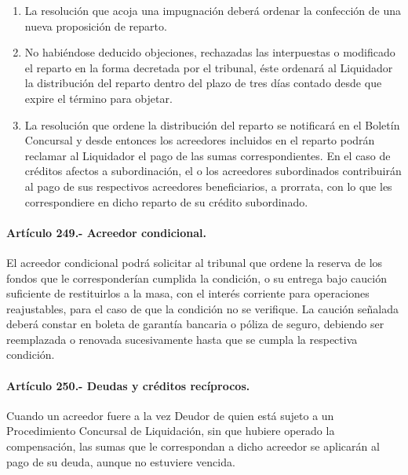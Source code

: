 \documentclass[
]{book}
\begin{document}
\begin{enumerate}
\def\labelenumi{\arabic{enumi})}
\setcounter{enumi}{6}
\item
  La resolución que acoja una impugnación deberá ordenar la confección de una nueva proposición de reparto.
\item
  No habiéndose deducido objeciones, rechazadas las interpuestas o modificado el reparto en la forma decretada por el tribunal, éste ordenará al Liquidador la distribución del reparto dentro del plazo de tres días contado desde que expire el término para objetar.
\item
  La resolución que ordene la distribución del reparto se notificará en el Boletín Concursal y desde entonces los acreedores incluidos en el reparto podrán reclamar al Liquidador el pago de las sumas correspondientes. En el caso de créditos afectos a subordinación, el o los acreedores subordinados contribuirán al pago de sus respectivos acreedores beneficiarios, a prorrata, con lo que les correspondiere en dicho reparto de su crédito subordinado.
\end{enumerate}

\hypertarget{artuxedculo-249.--acreedor-condicional.}{%
\paragraph*{Artículo 249.- Acreedor condicional.}\label{artuxedculo-249.--acreedor-condicional.}}

El acreedor condicional podrá solicitar al tribunal que ordene la reserva de los fondos que le corresponderían cumplida la condición, o su entrega bajo caución suficiente de restituirlos a la masa, con el interés corriente para operaciones reajustables, para el caso de que la condición no se verifique. La caución señalada deberá constar en boleta de garantía bancaria o póliza de seguro, debiendo ser reemplazada o renovada sucesivamente hasta que se cumpla la respectiva condición.

\hypertarget{artuxedculo-250.--deudas-y-cruxe9ditos-recuxedprocos.}{%
\paragraph*{Artículo 250.- Deudas y créditos recíprocos.}\label{artuxedculo-250.--deudas-y-cruxe9ditos-recuxedprocos.}}

Cuando un acreedor fuere a la vez Deudor de quien está sujeto a un Procedimiento Concursal de Liquidación, sin que hubiere operado la compensación, las sumas que le correspondan a dicho acreedor se aplicarán al pago de su deuda, aunque no estuviere vencida.
\end{document}
